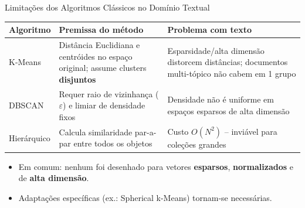 \documentclass[aspectratio=43]{beamer}
\begin{document}
\begin{frame}[t]{Limitações dos Algoritmos Clássicos no Domínio Textual}

\vspace{0.2cm}

\scriptsize
\renewcommand{\arraystretch}{1.4} 

\begin{center}
\begin{tabular}{
    P{1.8cm} 
    P{4.5cm}
    P{4.2cm}
}
\hline
\textbf{Algoritmo} & \textbf{Premissa do método} & \textbf{Problema com texto} \\
\hline
K-Means & Distância Euclidiana e centróides no espaço original; assume clusters \textbf{disjuntos} & Esparsidade/alta dimensão distorcem distâncias; documentos multi-tópico não cabem em 1 grupo \\
DBSCAN & Requer raio de vizinhança ($\varepsilon$) e limiar de densidade fixos & Densidade não é uniforme em espaços esparsos de alta dimensão \\
Hierárquico & Calcula similaridade par-a-par entre todos os objetos & Custo $O(N^2)$ -- inviável para coleções grandes \\
\hline
\end{tabular}
\end{center}

\vspace{0.2cm}

\normalsize
\begin{itemize}
    \item Em comum: nenhum foi desenhado para vetores \textbf{esparsos}, \textbf{normalizados} e de \textbf{alta dimensão}.
    \item Adaptações específicas (ex.: Spherical k-Means) tornam-se necessárias.
\end{itemize}

\end{frame}
\end{document}
